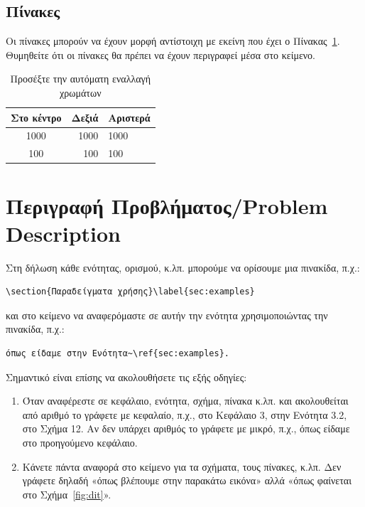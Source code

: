 \documentclass[a4paper,11pt]{article}
\begin{document}


\subsection{Πίνακες}\label{sec:tables}
Οι πίνακες μπορούν να έχουν μορφή αντίστοιχη με εκείνη που έχει ο Πίνακας~\ref{tab:example}. Θυμηθείτε ότι οι πίνακες θα πρέπει να έχουν περιγραφεί μέσα στο κείμενο.

\begin{table}
\centering
{}
\begin{tabular}{|c|r|l|}\hline
\rowcolor{gray}
Στο κέντρο & Δεξιά & Αριστερά \\\hline\hline
    1000 & 1000 & 1000 \\\hline
    100 & 100 & 100 \\ \hline
\end{tabular}
\caption{Προσέξτε την αυτόματη εναλλαγή χρωμάτων}
\label{tab:example}
\end{table}

%
%
\section{Περιγραφή Προβλήματος/Problem Description}\label{sec:descr}

Στη δήλωση κάθε ενότητας, ορισμού, κ.λπ. μπορούμε να ορίσουμε μια πινακίδα, π.χ.:
\begin{verbatim}
\section{Παραδείγματα χρήσης}\label{sec:examples}
\end{verbatim}
και στο κείμενο να αναφερόμαστε σε αυτήν την ενότητα χρησιμοποιώντας την πινακίδα, π.χ.:
\begin{verbatim}
όπως είδαμε στην Ενότητα~\ref{sec:examples}.
\end{verbatim}

Σημαντικό είναι επίσης να ακολουθήσετε τις εξής οδηγίες:
\begin{enumerate}
    \item Όταν αναφέρεστε σε κεφάλαιο, ενότητα, σχήμα, πίνακα κ.λπ. και ακολουθείται από αριθμό το γράφετε με κεφαλαίο, π.χ., στο Κεφάλαιο 3, στην Ενότητα 3.2, στο Σχήμα 12. Αν δεν υπάρχει αριθμός το γράφετε με μικρό, π.χ., όπως είδαμε στο προηγούμενο κεφάλαιο.
    \item Κάνετε πάντα αναφορά στο κείμενο για τα σχήματα, τους πίνακες, κ.λπ. Δεν γράφετε δηλαδή «όπως βλέπουμε στην παρακάτω εικόνα» αλλά «όπως φαίνεται στο Σχήμα~\ref{fig:dit}».
\end{enumerate}
\end{document}
